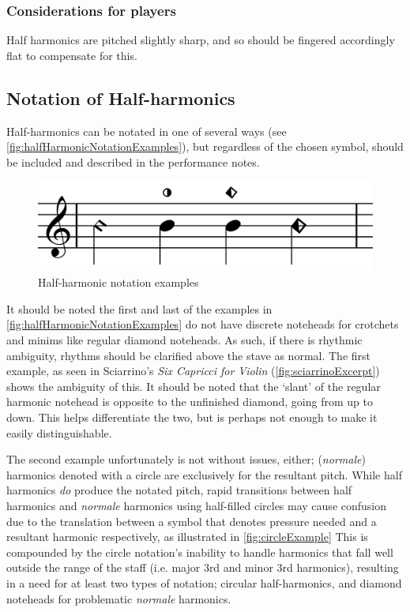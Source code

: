 \subsubsection{Considerations for players}
Half harmonics are pitched slightly sharp, and so should be fingered accordingly flat to compensate for this.\autocite[113]{welbanksFoundationsModernCello}

\subsection{Notation of Half-harmonics} \label{sec:notation-half-harmonics}
Half-harmonics can be notated in one of several ways (see \autoref{fig:halfHarmonicNotationExamples}), but regardless of the chosen symbol, should be included and described in the performance notes.


\begin{figure}
    \includegraphics[width=\linewidth]{./resources/halfHarmonicNotationExamples.pdf}
    \caption{Half-harmonic notation examples} \label{fig:halfHarmonicNotationExamples}
  \end{figure}

It should be noted the first and last of the examples in \autoref{fig:halfHarmonicNotationExamples} do not have discrete noteheads for crotchets and minims like regular diamond noteheads.
As such, if there is rhythmic ambiguity, rhythms should be clarified above the stave as normal.
The first example, as seen in Sciarrino's \emph{Six Capricci for Violin} (\autoref{fig:sciarrinoExcerpt}) shows the ambiguity of this.
It should be noted that the `slant' of the regular harmonic notehead is opposite to the unfinished diamond, going from up to down.
This helps differentiate the two, but is perhaps not enough to make it easily distinguishable.

The second example unfortunately is not without issues, either; (\emph{normale}) harmonics denoted with a circle are exclusively for the resultant pitch.\autocite[419]{gouldBars2011} 
While half harmonics \emph{do} produce the notated pitch, rapid transitions between half harmonics and \emph{normale} harmonics using half-filled circles may cause confusion due to the translation between a symbol that denotes pressure needed and a resultant harmonic respectively, as illustrated in \autoref{fig:circleExample}
This is compounded by the circle notation's inability to handle harmonics that fall well outside the range of the staff (i.e. major 3rd and minor 3rd harmonics), resulting in a need for at least two types of notation; circular half-harmonics, and diamond noteheads for problematic \emph{normale} harmonics.

